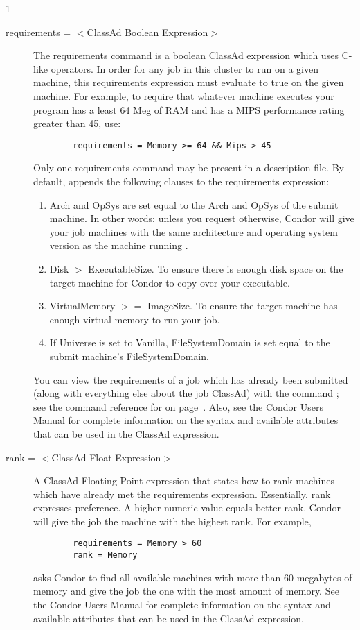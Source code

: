 \begin{ManPage}{\label{man-condor-submit}}{1}
\begin{description}
\item[requirements = $<$ClassAd Boolean Expression$>$] The requirements
command is a boolean ClassAd expression which uses C-like operators. In
order for any job in this cluster to run on a given machine, this
requirements expression must evaluate to true on the given machine. For
example, to require that whatever machine executes your program has a
least 64 Meg of RAM and has a MIPS performance rating greater than 45,
use: 
\begin{verbatim}
        requirements = Memory >= 64 && Mips > 45
\end{verbatim}
Only one requirements command may be present in a
description file. By default,  
appends the following clauses to the requirements expression:
\begin{enumerate}
	\item Arch and OpSys are set equal to the Arch and OpSys of the
submit machine.  In other words: unless you request otherwise, Condor will give your
job machines with the same architecture and operating system version as
the machine running .
	\item Disk $>$ ExecutableSize.  To ensure there is enough disk space on the 
target machine for Condor to copy over your executable.
	\item VirtualMemory $>=$ ImageSize.  To ensure the target machine
has enough virtual memory to run your job.
	\item If Universe is set to Vanilla, FileSystemDomain is set equal to
the submit machine's FileSystemDomain.
\end{enumerate}
You can view the requirements of a job
which has already been submitted (along with everything else about the
job ClassAd) with the command ; see the command reference for
 on page~\pageref{man-condor-q}.  Also, see the Condor Users
Manual for complete information on the syntax and available attributes
that can be used in the ClassAd expression.


\item[rank = $<$ClassAd Float Expression$>$] A ClassAd Floating-Point 
expression that states how to rank machines which have already met the requirements
expression. Essentially, rank expresses preference.  A higher numeric value 
equals better rank. Condor will give the job the machine with the 
highest rank.  For example,
\begin{verbatim}
        requirements = Memory > 60
        rank = Memory
\end{verbatim}
asks Condor to find all available machines with more than 60 megabytes of memory
and give the job the one with the most amount of memory.  See the Condor Users
Manual for complete information on the syntax and available attributes
that can be used in the ClassAd expression.


\end{description}
\end{ManPage}
